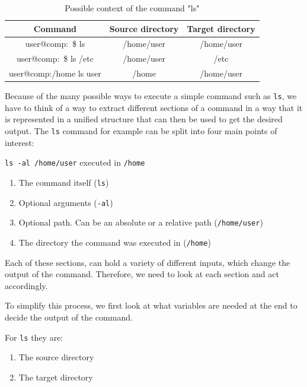 \begin{table}[H]
    \centering
    \begin{tabular}{c|c|c}
        Command & Source directory & Target directory\\
        \hline
        user@comp:~\$ ls & /home/user & /home/user \\
        user@comp:~\$ ls /etc & /home/user & /etc \\
        user@comp:/home ls user & /home & /home/user \\
    \end{tabular}
    \caption{Possible context of the command "ls"}
    \label{tab:my_label}
\end{table}

Because of the many possible ways to execute a simple command such as \texttt{ls}, we have to think of a way to extract different sections of a command in a way that it is represented in a unified structure that can then be used to get the desired output.
The \texttt{ls} command for example can be split into four main points of interest:

\texttt{\color{blue}ls \color{red}-al \color{green}/home/user} executed in \texttt{\color{orange}/home}

\begin{enumerate}
    \item The command itself (\texttt{\color{blue}ls})
    \item Optional arguments (\texttt{\color{red}-al})
    \item Optional path. Can be an absolute or a relative path (\texttt{\color{green}/home/user})
    \item The directory the command was executed in (\texttt{\color{orange}/home})
\end{enumerate}


Each of these sections, can hold a variety of different inputs, which change the output of the command.
Therefore, we need to look at each section and act accordingly.

To simplify this process, we first look at what variables are needed at the end to decide the output of the command.

For \texttt{ls} they are:

\begin{enumerate}
    \item The source directory
    \item The target directory
\end{enumerate}

